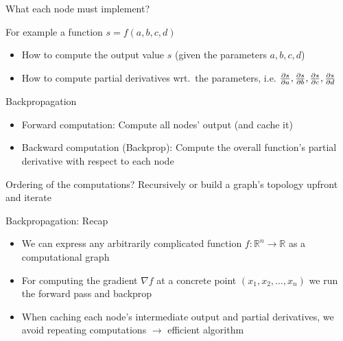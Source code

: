 \documentclass[12pt,aspectratio=169,handout]{beamer}
\begin{document}
\begin{frame}{What each node must implement?}
	
	For example a function $s = f(a, b, c, d)$
	
	\begin{itemize}
		\item How to compute the output value $s$ (given the parameters $a, b, c, d$)
		\item How to compute partial derivatives wrt.\ the parameters, i.e. $\pdv{s}{a}, \pdv{s}{b}, \pdv{s}{c}, \pdv{s}{d}$
	\end{itemize}
	
\end{frame}

\begin{frame}{Backpropagation}
	
	\begin{itemize}
		\item Forward computation: Compute all nodes' output (and cache it)
		\item Backward computation (Backprop): Compute the overall function's partial derivative with respect to each node
	\end{itemize}
	
	\bigskip
	
	Ordering of the computations? Recursively or build a graph's topology upfront and iterate
	
\end{frame}


\begin{frame}{Backpropagation: Recap}
	\begin{itemize}
		\item We can express any arbitrarily complicated function $f: \mathbb{R}^n \to \mathbb{R}$ as a computational graph
		\item For computing the gradient $\nabla f$ at a concrete point $(x_1, x_2, \ldots, x_n)$ we run the forward pass and backprop
		\item When caching each node's intermediate output and partial derivatives, we avoid repeating computations $\to$ efficient algorithm
	\end{itemize}
\end{frame}
\end{document}
